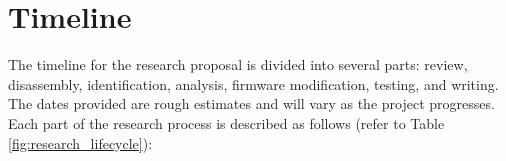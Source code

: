 \chapter{\leavevmode Timeline}
\label{chap:timeline}

The timeline for the research proposal is divided into several parts: review, disassembly, identification, analysis, firmware modification, testing, and writing. The dates provided are rough estimates and will vary as the project progresses. Each part of the research process is described as follows (refer to Table \ref{fig:research_lifecycle}):


